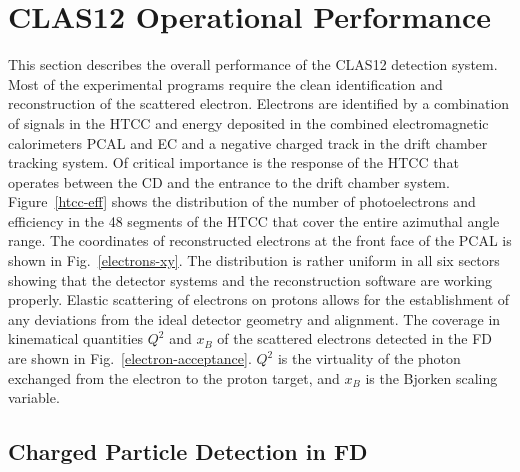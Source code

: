\documentclass[final,3p,twocolumn]{elsarticle}
\begin{document}
\section{CLAS12 Operational Performance}
This section describes the overall performance of the CLAS12 detection system. 
Most of the experimental programs require the clean identification and reconstruction of the scattered electron. 
Electrons are identified by a combination of signals in the HTCC and energy deposited in the combined 
electromagnetic calorimeters PCAL and EC and a negative charged track in the drift chamber tracking 
system. Of critical importance is the response of the HTCC that operates between the CD and the entrance to the drift chamber 
system. Figure~\ref{htcc-eff} shows the distribution of the number of photoelectrons and efficiency in the 48 segments of the HTCC that cover the entire azimuthal angle range. 
The coordinates of reconstructed electrons at the front face of the PCAL is shown in Fig.~\ref{electrons-xy}. 
The distribution is rather uniform in all six sectors showing that the detector systems and the reconstruction software are working properly.
 Elastic scattering  of electrons on protons allows for the establishment of any deviations from the ideal detector 
geometry and alignment. The coverage in kinematical quantities $Q^2$ and $x_B$ of the scattered electrons detected in the FD are shown in Fig.~\ref{electron-acceptance}. $Q^2$ is the virtuality of the 
photon exchanged from the electron to the proton target, and $x_B$ is the Bjorken scaling variable.

 \subsection{\rm Charged Particle Detection in FD}
 
\end{document}
